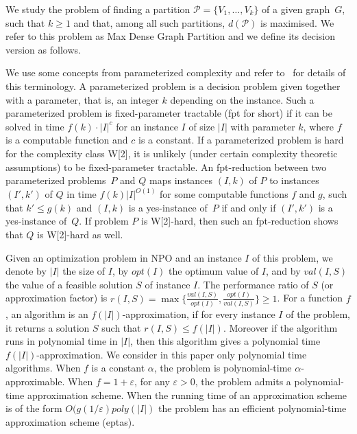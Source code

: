\documentclass[a4paper,USenglish,cleveref, autoref]{lipics-v2021}
\begin{document}
 
We study the problem of finding a partition $\mathcal{P} = \{ V_1, \dots, V_k\}$ of a given graph~$G$, such that $k \geq 1$  
and that, among all such partitions,  $d(\mathcal{P})$ is maximised. We refer to this problem as {\sc Max Dense Graph Partition} and we define its decision version as follows.

\begin{center}
\end{center}
 
We use some concepts from parameterized complexity and refer to~\cite{CFK+15,DowFel2013} for details of this terminology. A parameterized problem is a decision problem given together with a parameter, that is, an integer $k$ depending on the instance.
Such a parameterized problem is fixed-parameter tractable (fpt for short) if it can be solved in time $f(k)\cdot|I|^c$ for an instance $I$ of size $|I|$ with parameter $k$, where $f$ is a computable function and $c$ is a constant. If a parameterized problem is hard for the complexity class W[2], it is unlikely (under certain complexity theoretic assumptions) to be fixed-parameter tractable. An fpt-reduction between two parameterized problems~$P$ and $Q$ maps instances $(I,k)$ of $P$ to instances $(I',k')$ of $Q$ in time $f(k)|I|^{O(1)}$ for some computable functions $f$ and $g$, such that $k'\leq g(k)$ and $(I,k)$ is a yes-instance of~$P$ if and only if $(I',k')$
is a yes-instance of~$Q$. If problem $P$ is W[2]-hard, then such an fpt-reduction shows that $Q$ is W[2]-hard as well.

Given an optimization problem in NPO and an instance $I$ of this problem, we denote by $|I|$ the size of $I$, by $opt(I)$
the optimum value of $I$, and by $val(I, S)$ the value of a feasible solution $S$ of instance $I$. The performance ratio of $S$ (or
approximation factor) is $r(I, S) = \max  \{\frac{val(I,S)}{opt(I)},\frac{opt(I)}{val(I,S)}\}\geq 1$.  
For a function $f$, an algorithm is an $f(|I|)$-approximation, if for every instance $I$ of the problem, it returns a solution $S$
such that $r(I, S) \leq  f (|I|)$. Moreover if the algorithm runs in polynomial time in  $|I|$, then this algorithm gives a polynomial time $f(|I|)$-approximation.
We consider in this paper only polynomial time algorithms. When $f$ is a constant $\alpha$, the problem is polynomial-time $\alpha$-approximable. When $f=1+\varepsilon$, for any $\varepsilon >0$, the problem admits a polynomial-time approximation scheme. When the running time of an approximation scheme is of the form $O(g(1/\varepsilon)poly(|I|)$ the problem has an efficient polynomial-time approximation scheme (eptas). 
\end{document}
